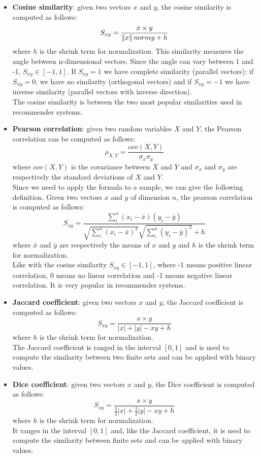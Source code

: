 \begin{itemize}

\item \textbf{Cosine similarity}: given two vectors $x$ and $y$, the cosine similarity is computed as follows:
\[ S_{xy} = \frac{x \times y}{\left\lVert x\right\rVert\\norm{y} + h} \]
where $h$ is the shrink term for normalization.
This similarity measures the angle between n-dimensional vectors. Since the angle can vary between 1 and -1, $S_{xy} \in [-1, 1]$. If $S_{xy} = 1$ we have complete similarity (parallel vectors); if $S_{xy} = 0$, we have no similarity (orthogonal vectors) and if $S_{xy} = -1$ we have inverse similarity (parallel vectors with inverse direction).\\
The cosine similarity is between the two most popular similarities used in recommender systems.

\item \textbf{Pearson correlation}: given two random variables $X$ and $Y$, the Pearson correlation can be computed as follows:
\[ \rho_{X,Y} = \frac{cov(X,Y)}{\sigma_x \sigma_y} \]
where $cov(X,Y)$ is the covariance between $X$ and $Y$ and $\sigma_x$ and $\sigma_y$ are respectively the standard deviations of $X$ and $Y$.\\
Since we need to apply the formula to a sample, we can give the following definition. Given two vectors $x$ and $y$ of dimension $n$, the pearson correlation is computed as follows:
\[ S_{xy} = \frac{\sum_{i}^{n} (x_i - \bar{x})(y_i - \bar{y})}{\sqrt{\sum_{i}^{n} (x_i - \bar{x})^2}\sqrt{\sum_{i}^{n} (y_i - \bar{y})^2} + h} \]
where $\bar{x}$ and $\bar{y}$ are respectively the means of $x$ and $y$ and $h$ is the shrink term for normalization.\\
Like with the cosine similarity $S_{xy} \in [-1, 1]$, where -1 means positive linear correlation, 0 means no linear correlation and -1 means negative linear correlation. It is very popular in recommender systems.

\item \textbf{Jaccard coefficient}: given two vectors $x$ and $y$, the Jaccard coefficient is computed as follows:
\[ S_{xy} = \frac{x \times y}{|x| + |y| - xy + h} \]
where $h$ is the shrink term for normalization.\\
The Jaccard coefficient is ranged in the interval $[0, 1]$ and is used to compute the similarity between two finite sets and can be applied with binary values.

\item \textbf{Dice coefficient}: given two vectors $x$ and $y$, the Dice coefficient is computed as follows:
\[ S_{xy} = \frac{x \times y}{\frac{1}{2}|x| + \frac{1}{2}|y| - xy + h} \]
where $h$ is the shrink term for normalization.\\
It ranges in the interval $[0, 1]$ and, like the Jaccard coefficient, it is used to compute the similarity between finite sets and can be applied with binary values.


\end{itemize}
